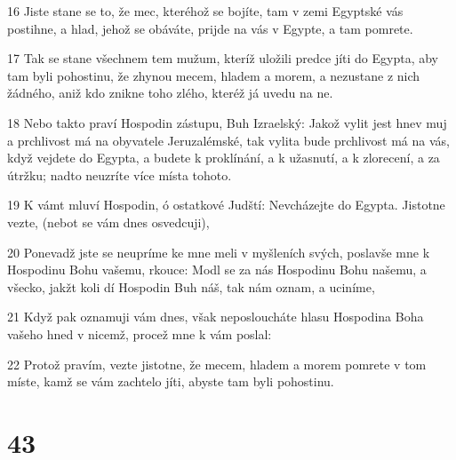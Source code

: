 \par 16 Jiste stane se to, že mec, kteréhož se bojíte, tam v zemi Egyptské vás postihne, a hlad, jehož se obáváte, prijde na vás v Egypte, a tam pomrete.
\par 17 Tak se stane všechnem tem mužum, kteríž uložili predce jíti do Egypta, aby tam byli pohostinu, že zhynou mecem, hladem a morem, a nezustane z nich žádného, aniž kdo znikne toho zlého, kteréž já uvedu na ne.
\par 18 Nebo takto praví Hospodin zástupu, Buh Izraelský: Jakož vylit jest hnev muj a prchlivost má na obyvatele Jeruzalémské, tak vylita bude prchlivost má na vás, když vejdete do Egypta, a budete k proklínání, a k užasnutí, a k zlorecení, a za útržku; nadto neuzríte více místa tohoto.
\par 19 K vámt mluví Hospodin, ó ostatkové Judští: Nevcházejte do Egypta. Jistotne vezte, (nebot se vám dnes osvedcuji),
\par 20 Ponevadž jste se neupríme ke mne meli v myšleních svých, poslavše mne k Hospodinu Bohu vašemu, rkouce: Modl se za nás Hospodinu Bohu našemu, a všecko, jakžt koli dí Hospodin Buh náš, tak nám oznam, a uciníme,
\par 21 Když pak oznamuji vám dnes, však neposloucháte hlasu Hospodina Boha vašeho hned v nicemž, procež mne k vám poslal:
\par 22 Protož pravím, vezte jistotne, že mecem, hladem a morem pomrete v tom míste, kamž se vám zachtelo jíti, abyste tam byli pohostinu.

\chapter{43}

